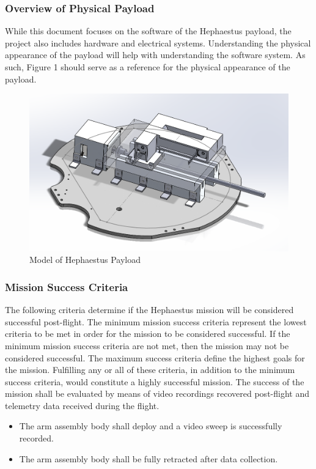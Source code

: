 \subsubsection{Overview of Physical Payload}
While this document focuses on the software of the Hephaestus payload, the project also includes hardware
 and electrical systems. 
Understanding the physical appearance of the payload will help with understanding the software system. 
As such, Figure 1 should serve as a reference for the physical appearance of the payload.
\begin{figure}
\includegraphics[scale=.5]{./images/img2}
\caption{Model of Hephaestus Payload}
\end{figure}

\subsubsection{Mission Success Criteria}
The following criteria determine if the Hephaestus mission will be considered successful post-flight.
The minimum mission success criteria represent the lowest criteria to be met in order for the mission to be considered successful.
If the minimum mission success criteria are not met, then the mission may not be considered successful.
The maximum success criteria define the highest goals for the mission.
Fulfilling any or all of these criteria, in addition to the minimum success criteria, would constitute a highly successful mission.
The success of the mission shall be evaluated by means of video recordings recovered post-flight and telemetry data received during the flight.

\begin{itemize}
\item{The arm assembly body shall deploy and a video sweep is successfully recorded.}
\item{The arm assembly body shall be fully retracted after data collection.}
\end{itemize}

